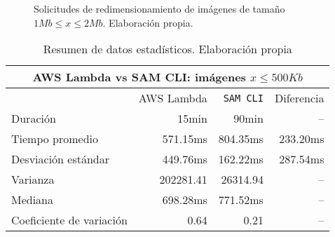 \begin{figure}[h]
\hspace{-1cm}
\caption[\hspace{0.2cm} Solicitudes de redimensionamiento de imágenes de tamaño $1Mb \leq x \leq 2Mb$]{Solicitudes de redimensionamiento de imágenes de tamaño $1Mb \leq x \leq 2Mb$. Elaboración propia.}
\label{fig:comparacion-sam-500kb}
\end{figure}

\begin{table}
    \centering
    \begin{tabular}{l|r|r|r}
        \toprule[1.5pt]
         \multicolumn{4}{c}{\textbf{AWS Lambda vs SAM CLI: imágenes $x \leq 500Kb$}} \\
         \midrule
         & AWS Lambda & \texttt{SAM CLI} & Diferencia \\ 
         \midrule
        Duración & 15min & 90min & -- \\
        Tiempo promedio  & 571.15ms & 804.35ms & 233.20ms\\
        Desviación estándar & 449.76ms & 162.22ms & 287.54ms \\
        Varianza & 202281.41 & 26314.94 & -- \\
        Mediana & 698.28ms & 771.52ms & -- \\
        Coeficiente de variación & 0.64 & 0.21 & -- \\                        
        \bottomrule[1.5pt]
    \end{tabular}
    \caption[AWS Lambda vs SAM CLI: imágenes $x \leq 500Kb$]{Resumen de datos estadísticos. Elaboración propia}
    \label{table:sam-datos-estadisticos-hasta-500kb}
\end{table}

